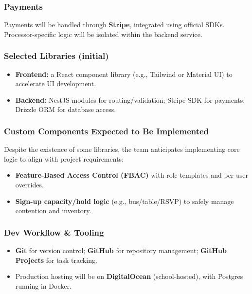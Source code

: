 \documentclass{article}
\begin{document}
\subsubsection*{Payments} 
Payments will be handled through \textbf{Stripe}, integrated using official SDKs. 
Processor-specific logic will be isolated within the backend service.

\subsubsection*{Selected Libraries (initial)}
\begin{itemize}
  \item \textbf{Frontend:} a React component library (e.g., Tailwind or Material UI) to accelerate UI development.
  \item \textbf{Backend:} NestJS modules for routing/validation; Stripe SDK for payments; Drizzle ORM for database access.
\end{itemize}

\subsubsection*{Custom Components Expected to Be Implemented} 
Despite the existence of some libraries, the team anticipates implementing core logic to align with project requirements:
\begin{itemize}
  \item \textbf{Feature-Based Access Control (FBAC)} with role templates and per-user overrides.
  \item \textbf{Sign-up capacity/hold logic} (e.g., bus/table/RSVP) to safely manage contention and inventory.
\end{itemize}

\subsubsection*{Dev Workflow \& Tooling}
\begin{itemize}
  \item \textbf{Git} for version control; \textbf{GitHub} for repository management; \textbf{GitHub Projects} for task tracking.
  \item Production hosting will be on \textbf{DigitalOcean} (school-hosted), with Postgres running in Docker.
\end{itemize}
\end{document}
